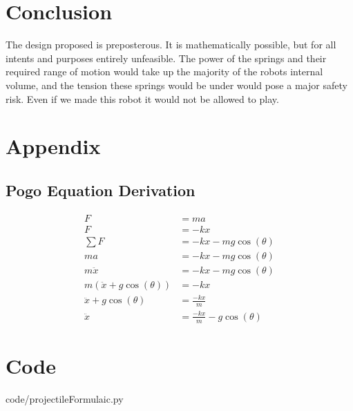 \documentclass[12pt, letterpaper]{article}
\begin{document}
\section{Conclusion}
The design proposed is preposterous. It is mathematically possible, but for all intents and purposes entirely
unfeasible. The power of the springs and their required range of motion would take up the majority of the
robots internal volume, and the tension these springs would be under would pose a major safety risk. Even if
we made this robot it would not be allowed to play.

\newpage{}
\printbibliography{}

\newpage{}
\section{Appendix}
\listoffigures{}


\begin{singlespace}
\subsection*{Pogo Equation Derivation}
\begin{equation}
  \label{eq:derivation}
  \begin{split}
    F &= ma \\
    F &= -kx \\
    \sum F &= -kx - mg\cos(\theta) \\
    ma &= -kx - mg\cos(\theta) \\
    m\ddot{x} &= -kx - mg\cos(\theta) \\
    m(\ddot{x} + g\cos(\theta)) &= -kx \\
    \ddot{x} + g\cos(\theta) &= \frac{-kx}{m} \\
    \ddot{x} &= \frac{-kx}{m} - g\cos(\theta)
  \end{split}
\end{equation}
\end{singlespace}

\section*{Code}


{code/projectileFormulaic.py}

\end{document}
